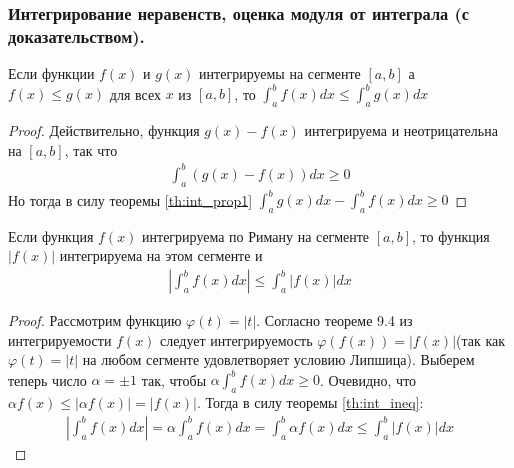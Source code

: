 \documentclass[10pt]{article}
\begin{document}
    \subsubsection{Интегрирование неравенств, оценка модуля от интеграла (с доказательством).}
    \begin{theorem}
        Если функции $f(x)$ и $g(x)$ интегрируемы на сегменте $[a, b]$ а $f(x) \leq g(x)$ для всех $x$ из $[a, b]$, то $\int_a^b f(x) dx \leq \int_a^b g(x) dx$
        \label{th:int_ineq}
    \end{theorem}
    \begin{proof}
        Действительно, функция $g(x) - f(x)$ интегрируема и неотрицательна на $[a, b]$, так что
        \begin{gather*}
            \int_a^b (g(x) - f(x)) dx \geq 0
        \end{gather*}
        Но тогда в силу теоремы \ref{th:int_prop1} $\int_a^b g(x) dx - \int_a^b f(x) dx \geq 0$
    \end{proof}
    \begin{theorem}
        Если функция $f(x)$ интегрируема по Риману на сегменте $[a, b]$, то функция $|f(x)|$ интегрируема на этом сегменте и
        \begin{gather*}
            \left| \int_a^b f(x) dx \right| \leq \int_a^b |f(x)| dx
        \end{gather*}
    \end{theorem}
    \begin{proof}
        Рассмотрим функцию $\varphi(t) = |t|$. Согласно теореме 9.4 из интегрируемости $f(x)$ следует интегрируемость $\varphi(f(x)) = |f(x)|$(так как $\varphi(t) = |t|$ на любом сегменте удовлетворяет условию Липшица). Выберем теперь число $\alpha = \pm 1$ так, чтобы $\alpha \int_a^b f(x) dx \geq 0$. Очевидно, что $\alpha f(x) \leq |\alpha f(x)| = |f(x)|$. Тогда в силу теоремы \ref{th:int_ineq}:
        \begin{gather*}
            \left| \int_a^b f(x) dx \right| = \alpha \int_a^b f(x) dx = \int_a^b \alpha f(x) dx \leq \int_a^b |f(x)| dx
        \end{gather*}
    \end{proof}
\end{document}
